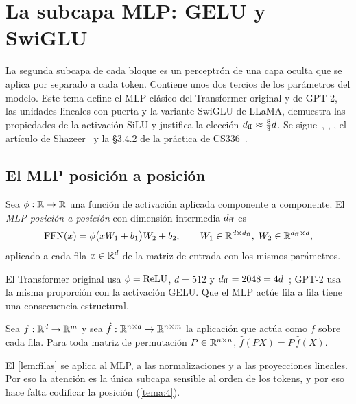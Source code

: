 \chapter{La subcapa MLP: GELU y SwiGLU}
\label{tema:3}

La segunda subcapa de cada bloque es un perceptrón de una capa oculta que se aplica por separado a cada token. Contiene unos dos tercios de los parámetros del modelo. Este tema define el MLP clásico del Transformer original y de GPT-2, las unidades lineales con puerta y la variante SwiGLU de LLaMA, demuestra las propiedades de la activación SiLU y justifica la elección $d_{\mathrm{ff}}\approx\frac83 d$. Se sigue~\cite[§3.3]{vaswani}, \cite[§11.7.2]{d2l}, \cite[§7.2.1]{jm3}, el artículo de Shazeer~\cite{shazeer} y la §3.4.2 de la práctica de CS336~\cite{cs336}.

\section{El MLP posición a posición}

\begin{definicion}\label{def:ffn}
Sea $\phi:\mathbb{R}\to\mathbb{R}$ una función de activación aplicada componente a componente. El \emph{MLP posición a posición} con dimensión intermedia $d_{\mathrm{ff}}$ es
\[
\operatorname{FFN}(x)=\phi\bigl(xW_1+b_1\bigr)W_2+b_2,\qquad W_1\in\mathbb{R}^{d\times d_{\mathrm{ff}}},\;W_2\in\mathbb{R}^{d_{\mathrm{ff}}\times d},
\]
aplicado a cada fila $x\in\mathbb{R}^{d}$ de la matriz de entrada con los mismos parámetros.
\end{definicion}

El Transformer original usa $\phi=\operatorname{ReLU}$, $d=512$ y $d_{\mathrm{ff}}=2048=4d$~\cite[§3.3]{vaswani}; GPT-2 usa la misma proporción con la activación GELU. Que el MLP actúe fila a fila tiene una consecuencia estructural.

\begin{lema}\label{lem:filas}
Sea $f:\mathbb{R}^{d}\to\mathbb{R}^{m}$ y sea $\hat f:\mathbb{R}^{n\times d}\to\mathbb{R}^{n\times m}$ la aplicación que actúa como $f$ sobre cada fila. Para toda matriz de permutación $P\in\mathbb{R}^{n\times n}$, $\hat f(PX)=P\,\hat f(X)$.
\end{lema}

El \cref{lem:filas} se aplica al MLP, a las normalizaciones y a las proyecciones lineales. Por eso la atención es la única subcapa sensible al orden de los tokens, y por eso hace falta codificar la posición (\cref{tema:4}).

